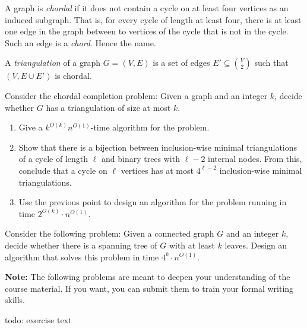 \documentclass{uebung_cs}
\begin{document}
\begin{exercise}
A graph is \emph{chordal} if it does not contain a cycle on at least four vertices as an induced subgraph.
That is, for every cycle of length at least four, 
there is at least one edge in the graph between to vertices of the cycle that is not in the cycle. 
Such an edge is a \emph{chord}. Hence the name.

A \emph{triangulation} of a graph $G=(V,E)$ is a set of edges $E' \subseteq \binom{V}{2}$ such that $(V,E\cup E')$ is chordal.

Consider the chordal completion problem: Given a graph and an integer $k$, decide whether $G$ has a triangulation of size at most $k$. 
\begin{enumerate}
\item Give a $k^{O(k)} n^{O(1)}$-time algorithm for the problem.
\item Show that there is a bijection between inclusion-wise minimal triangulations of a cycle of length $\ell$ and binary trees with $\ell-2$ internal nodes. From this, conclude that a cycle on $\ell$ vertices has at most $4^{\ell-2}$ inclusion-wise minimal triangulations.
\item Use the previous point to design an algorithm for the problem running in time $2^{O(k)} \cdot n^{O(1)}$.
\end{enumerate}
\end{exercise}

\begin{exercise}
Consider the following problem: Given a connected graph $G$ and an integer $k$, decide whether there is a spanning tree of $G$ with at least $k$ leaves. Design an algorithm that solves this problem in time $4^k \cdot n^{O(1)}$.
\end{exercise}

\newpage
\textbf{Note:} The following problems are meant to deepen your understanding of the course material. If you want, you can submit them to train your formal writing skills.

\begin{exercise}
  todo: exercise text
\end{exercise}
\end{document}
